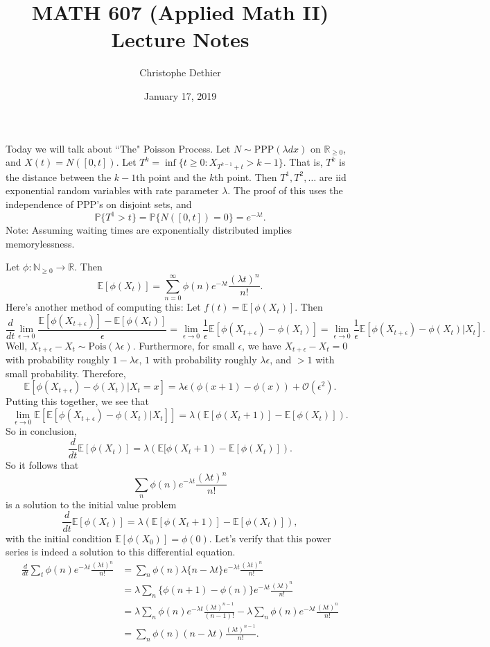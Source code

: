 \documentclass[12pt]{article}
\title{MATH 607 (Applied Math II) Lecture Notes}
\author{Christophe Dethier}
\date{January 17, 2019}
\newcommand{\PPP}{\text{PPP}}
\theoremstyle{plain}
\begin{document}
\bigskip
\maketitle

Today we will talk about ``The" Poisson Process. Let $N \sim \PPP(\lambda dx)$ on $\mathbb{R}_{\geq 0}$, and $X(t) = N([0,t])$. Let $T^k = \inf\{t \geq 0: X_{T^{k-1}+t} > k-1\}$. That is, $T^k$ is the distance between the $k-1$th point and the $k$th point. Then $T^1, T^2, \ldots$ are iid exponential random variables with rate parameter $\lambda$. The proof of this uses the independence of PPP's on disjoint sets, and 
\[
\mathbb{P}\{T^1 > t\} = \mathbb{P}\{N([0,t]) = 0\} = e^{-\lambda t}.
\]
Note: Assuming waiting times are exponentially distributed implies memorylessness.

Let $\phi: \mathbb{N}_{\geq 0} \rightarrow \mathbb{R}$. Then
\[
\mathbb{E}[\phi(X_t)] = \sum_{n = 0}^{\infty} \phi(n) e^{-\lambda t} \frac{(\lambda t)^n}{n!}.
\]
Here's another method of computing this: Let $f(t) = \mathbb{E}[\phi(X_t)]$. Then
\[
\frac{d}{dt} \lim_{\epsilon \rightarrow 0} \frac{\mathbb{E}[\phi(X_{t + \epsilon})] - \mathbb{E}[\phi(X_t)]}{\epsilon} = \lim_{\epsilon \rightarrow 0} \frac{1}{\epsilon} \mathbb{E}[\phi(X_{t + \epsilon}) - \phi(X_t)] = \lim_{\epsilon \rightarrow 0} \frac{1}{\epsilon} \mathbb{E}[\phi(X_{t + \epsilon}) - \phi(X_t)|X_t].
\]
Well, $X_{t + \epsilon} - X_t \sim \text{Pois}(\lambda \epsilon)$. Furthermore, for small $\epsilon$, we have $X_{t + \epsilon} - X_t = 0$ with probability roughly $1 - \lambda \epsilon$, $1$ with probability roughly $\lambda \epsilon$, and $>1$ with small probability. Therefore,
\[
\mathbb{E}[\phi(X_{t + \epsilon}) - \phi(X_t)|X_t = x] = \lambda \epsilon (\phi(x + 1) - \phi(x)) + \mathcal{O}(\epsilon^2).
\]
Putting this together, we see that
\[
\lim_{\epsilon \rightarrow 0} \mathbb{E}[\mathbb{E}[\phi(X_{t + \epsilon}) - \phi(X_t)|X_t]] = \lambda (\mathbb{E}[\phi(X_t + 1)] - \mathbb{E}[\phi(X_t)]).
\]
So in conclusion,
\[
\frac{d}{dt} \mathbb{E}[\phi(X_t)] = \lambda(\mathbb{E}[\phi(X_t + 1) - \mathbb{E}[\phi(X_t)]).
\]
So it follows that 
\[
\sum_n \phi(n) e^{-\lambda t} \frac{(\lambda t)^n}{n!}
\]
is a solution to the initial value problem
\[
\frac{d}{dt} \mathbb{E}[\phi(X_t)] = \lambda(\mathbb{E}[\phi(X_t + 1)] - \mathbb{E}[\phi(X_t)]),
\]
with the initial condition $\mathbb{E}[\phi(X_0)] = \phi(0)$. Let's verify that this power series is indeed a solution to this differential equation.
\begin{align*}
\frac{d}{dt} \sum_t \phi(n) e^{-\lambda t} \frac{(\lambda t)^n}{n!} &= \sum_n \phi(n)\lambda \{n - \lambda t\} e^{-\lambda t} \frac{(\lambda t)^n}{n!} \\
&= \lambda \sum_n \{\phi(n + 1) - \phi(n)\} e^{-\lambda t} \frac{(\lambda t)^n}{n!}\\
&= \lambda \sum_n \phi(n) e^{-\lambda t} \frac{(\lambda t)^{n-1}}{(n-1)!} - \lambda \sum_n \phi(n) e^{-\lambda t} \frac{(\lambda t)^n}{n!}\\
&= \sum_n \phi(n) (n - \lambda t) \frac{(\lambda t)^{n-1}}{n!}.
\end{align*}
\end{document}
